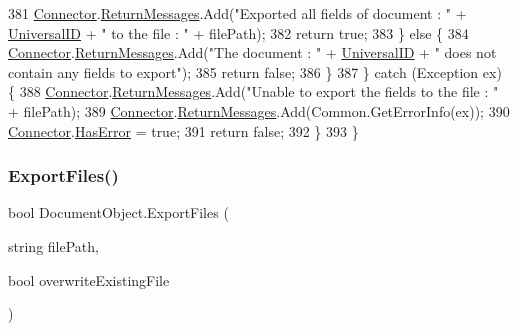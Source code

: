 \begin{DoxyCode}
381                 \mbox{\hyperlink{class_connector}{Connector}}.\mbox{\hyperlink{class_connector_a1ed422674b344524fd77998dcf6a9ba6}{ReturnMessages}}.Add(\textcolor{stringliteral}{"Exported all fields of document : "} + 
      \mbox{\hyperlink{class_document_object_a8b96d04632a2802e7cc5466ca5cee8cf}{UniversalID}} + \textcolor{stringliteral}{" to the file : "} + filePath);
382                 \textcolor{keywordflow}{return} \textcolor{keyword}{true};
383             \} \textcolor{keywordflow}{else} \{
384                 \mbox{\hyperlink{class_connector}{Connector}}.\mbox{\hyperlink{class_connector_a1ed422674b344524fd77998dcf6a9ba6}{ReturnMessages}}.Add(\textcolor{stringliteral}{"The document : "} + 
      \mbox{\hyperlink{class_document_object_a8b96d04632a2802e7cc5466ca5cee8cf}{UniversalID}} + \textcolor{stringliteral}{" does not contain any fields to export"});
385                 \textcolor{keywordflow}{return} \textcolor{keyword}{false};
386             \}
387         \} \textcolor{keywordflow}{catch} (Exception ex) \{
388             \mbox{\hyperlink{class_connector}{Connector}}.\mbox{\hyperlink{class_connector_a1ed422674b344524fd77998dcf6a9ba6}{ReturnMessages}}.Add(\textcolor{stringliteral}{"Unable to export the fields to the file : 
      "} + filePath);
389             \mbox{\hyperlink{class_connector}{Connector}}.\mbox{\hyperlink{class_connector_a1ed422674b344524fd77998dcf6a9ba6}{ReturnMessages}}.Add(Common.GetErrorInfo(ex));
390             \mbox{\hyperlink{class_connector}{Connector}}.\mbox{\hyperlink{class_connector_a9365777a6b7b711b75bcfa6c4d53e989}{HasError}} = \textcolor{keyword}{true};
391             \textcolor{keywordflow}{return} \textcolor{keyword}{false};
392         \}
393     \}
\end{DoxyCode}
\mbox{\label{class_document_object_a8753abc5a871bf84fc910e6a99936b2b}} 
\subsubsection{\texorpdfstring{Export\+Files()}{ExportFiles()}}
{\footnotesize\ttfamily bool Document\+Object.\+Export\+Files (\begin{DoxyParamCaption}\item[{string}]{file\+Path,  }\item[{bool}]{overwrite\+Existing\+File }\end{DoxyParamCaption})}



